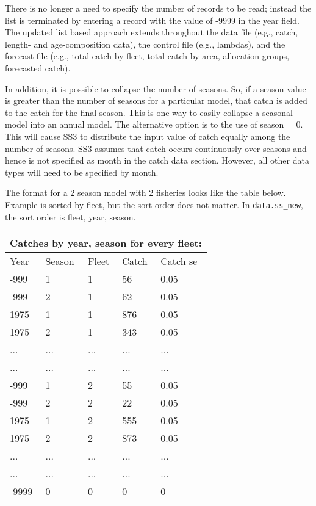 \hypertarget{ListBased}{}
There is no longer a need to specify the number of records to be read; instead the list is terminated by entering a record with the value of -9999 in the year field. The updated list based approach extends throughout the data file (e.g., catch, length- and age-composition data), the control file (e.g., lambdas), and the forecast file (e.g., total catch by fleet, total catch by area, allocation groups, forecasted catch).

In addition, it is possible to collapse the number of seasons. So, if a season value is greater than the number of seasons for a particular model, that catch is added to the catch for the final season. This is one way to easily collapse a seasonal model into an annual model. The alternative option is to the use of season = 0. This will cause SS3 to distribute the input value of catch equally among the number of seasons. SS3 assumes that catch occurs continuously over seasons and hence is not specified as month in the catch data section. However, all other data types will need to be specified by month.

The format for a 2 season model with 2 fisheries looks like the table below. Example is sorted by fleet, but the sort order does not matter. In \texttt{data.ss\_new}, the sort order is fleet, year, season.

\begin{center}
	\begin{tabular}{p{3cm} p{3cm} p{2cm} p{3cm} p{3cm}}
		\multicolumn{5}{l}{Catches by year, season for every fleet:} \\
		\hline
		Year & Season & Fleet & Catch & Catch \gls{se} \Tstrut\Bstrut\\
		\hline
		-999 & 1 & 1 & 56  & 0.05 \Tstrut\\
		-999 & 2 & 1 & 62  & 0.05 \\
		1975 & 1 & 1 & 876 & 0.05 \\
		1975 & 2 & 1 & 343 & 0.05 \\
		 ... & ... & ... & ... & ... \\
		 ... & ... & ... & ... & ... \\
		-999 & 1 & 2 & 55  & 0.05 \\
		-999 & 2 & 2 & 22  & 0.05 \\
		1975 & 1 & 2 & 555 & 0.05 \\
		1975 & 2 & 2 & 873 & 0.05 \\
		 ... & ... & ... & ... & ... \\
		 ... & ... & ... & ... & ... \\
		-9999 & 0 & 0 & 0 & 0 \Bstrut\\
		\hline
	\end{tabular}
\end{center}

